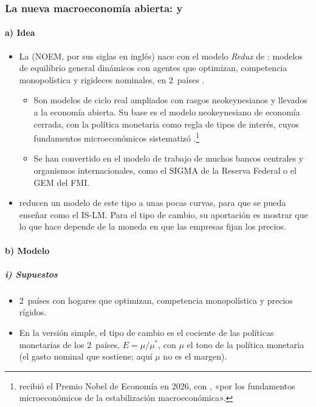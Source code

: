 \documentclass[11pt]{article}
\begin{document}
\subsubsection{La nueva macroeconomía abierta:  y }\label{sec:corsetti-pesenti}

\paragraph{a) Idea}
\begin{itemize}
\item La  (NOEM, por sus siglas en inglés) nace con el modelo \emph{Redux} de \textcite{ObstfeldRogoff1995Redux}: modelos de equilibrio general dinámicos con agentes que optimizan, competencia monopolística y rigideces nominales, en 2~países  .
  \begin{itemize}
  \item Son modelos de ciclo real ampliados con rasgos neokeynesianos y llevados a la economía abierta. Su base es el modelo neokeynesiano de economía cerrada, con la política monetaria como regla de tipos de interés, cuyos fundamentos microeconómicos sistematizó \textcite{Woodford2003Interest}.\footnote{ recibió el Premio Nobel de Economía en 2026, con , «por los fundamentos microeconómicos de la estabilización macroeconómica»\nocite{Nobel2026Prensa}.}
  \item Se han convertido en el modelo de trabajo de muchos bancos centrales y organismos internacionales, como el SIGMA de la Reserva Federal\nocite{ErcegGuerrieriGust2005} o el GEM del FMI\nocite{Bayoumi2004GEM}.
  \end{itemize}
\item \textcite{CorsettiPesenti2009} reducen un modelo de este tipo a unas pocas curvas, para que se pueda enseñar como el IS-LM. Para el tipo de cambio, su aportación es mostrar que lo que hace depende de la moneda en que las empresas fijan los precios.
\end{itemize}

\paragraph{b) Modelo}
\subparagraph{i) Supuestos}
\begin{itemize}
\item 2~países con hogares que optimizan, competencia monopolística y precios rígidos.
\item En la versión simple, el tipo de cambio es el cociente de las políticas monetarias de los 2~países, $E=\mu/\mu^*$, con $\mu$ el tono de la política monetaria (el gasto nominal que sostiene; aquí $\mu$ no es el margen).
\end{itemize}
\end{document}
